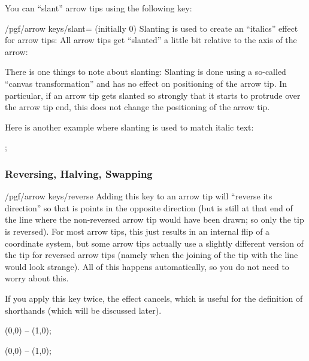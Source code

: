 You can ``slant'' arrow tips using the following key:

\begin{key}{/pgf/arrow keys/slant= (initially 0)}
  Slanting is used to create an ``italics'' effect for arrow tips: All
  arrow tips get ``slanted'' a little bit relative to the axis of the
  arrow:
\begin{codeexample}[]
\end{codeexample}  
  There is one things to note about slanting: Slanting is done using a
  so-called ``canvas transformation''  and has no effect on
  positioning of the arrow tip. In particular, if an arrow tip gets
  slanted so strongly that it starts to protrude over the arrow tip
  end, this does not change the positioning of the arrow tip.

  Here is another example where slanting is used to match italic text:
\begin{codeexample}[]
\tikz [>={[slant=.3] To[] To[]}]
  ;  
\end{codeexample}
\end{key}



\subsubsection{Reversing, Halving, Swapping}
\label{section-arrow-key-harpoon}

\begin{key}{/pgf/arrow keys/reverse}
  Adding this key to an arrow tip will ``reverse its direction'' so
  that is points in the opposite direction (but is still at that end of the
  line where the non-reversed arrow tip would have been drawn; so only
  the tip is reversed). For most arrow tips, this just results in an
  internal flip of a coordinate system, but some arrow tips actually
  use a slightly different version of the tip for reversed arrow tips
  (namely when the joining of the tip with the line would look
  strange). All of this happens automatically, so you do not need to
  worry about this.

  If you apply this key twice, the effect cancels, which is useful for
  the definition of shorthands (which will be discussed later).
\begin{codeexample}[width=3cm]
 \draw [arrows = {-Stealth[reversed]}] (0,0) -- (1,0);
\end{codeexample}
\begin{codeexample}[width=3cm]
 \draw [arrows = {-Stealth[reversed, reversed]}] (0,0) -- (1,0);
\end{codeexample}
\end{key}

